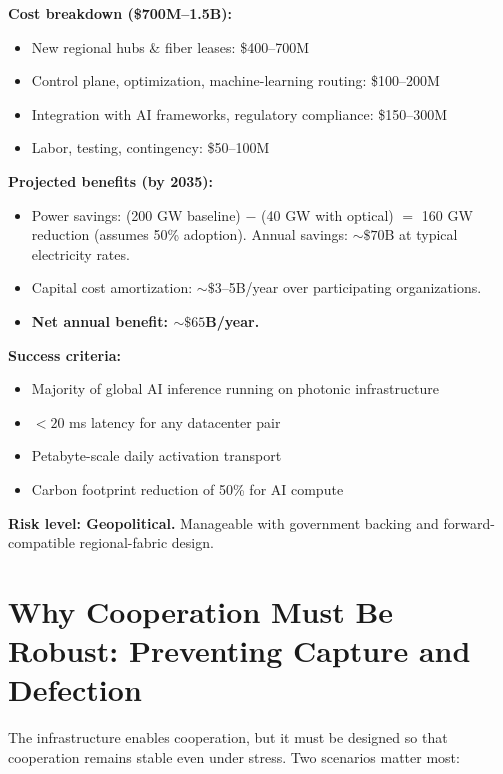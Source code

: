 \documentclass[12pt]{article}
\begin{document}
\textbf{Cost breakdown (\$700M--1.5B):}
\begin{itemize}[leftmargin=1.6em,itemsep=2pt]
  \item New regional hubs \& fiber leases: \$400--700M
  \item Control plane, optimization, machine-learning routing: \$100--200M
  \item Integration with AI frameworks, regulatory compliance: \$150--300M
  \item Labor, testing, contingency: \$50--100M
\end{itemize}

\textbf{Projected benefits (by 2035):}
\begin{itemize}[leftmargin=1.6em,itemsep=2pt]
  \item Power savings: (200 GW baseline) $-$ (40 GW with optical) \(=\) 160 GW reduction
  (assumes 50\% adoption). Annual savings: \(\sim\!\$70\)B at typical electricity rates.
  \item Capital cost amortization: \(\sim\!\$3\)--5B/year over participating
  organizations.
  \item \textbf{Net annual benefit: \(\sim\!\$65\)B/year.}
\end{itemize}

\textbf{Success criteria:}
\begin{itemize}[leftmargin=1.6em,itemsep=2pt]
  \item Majority of global AI inference running on photonic infrastructure
  \item $<20$ ms latency for any datacenter pair
  \item Petabyte-scale daily activation transport
  \item Carbon footprint reduction of 50\% for AI compute
\end{itemize}

\textbf{Risk level: Geopolitical.} Manageable with government backing and
forward-compatible regional-fabric design.

\section{Why Cooperation Must Be Robust: Preventing Capture and Defection}
\label{sec:robust}

The infrastructure enables cooperation, but it must be designed so that
cooperation remains stable even under stress. Two scenarios matter most:
\end{document}
